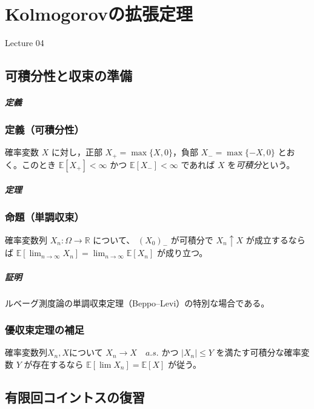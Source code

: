 \documentclass[uplatex,dvipdfmx,11pt,a4paper,openany]{bxjsbook}
\begin{document}
\chapter{Kolmogorovの拡張定理}
Lecture 04

\section{可積分性と収束の準備}
\paragraph{定義}
\subsection{定義（可積分性）}
確率変数 \(X\) に対し，正部 \(X_+=\max\{X,0\}\)，負部 \(X_-=\max\{-X,0\}\) とおく。このとき
                    \(\mathbb{E}[X_+]<\infty\) かつ \(\mathbb{E}[X_-]<\infty\) であれば \(X\) を\emph{可積分}という。


\paragraph{定理}
\subsection{命題（単調収束）}
確率変数列 \(X_n:\Omega\to\mathbb{R}\) 
について、                    \((X_0)_-\) が可積分で \(X_n\uparrow X\) が成立するならば
                    \(\mathbb{E}[\lim_{n\to\infty} X_n]=\lim_{n\to\infty}\mathbb{E}[X_n]\) が成り立つ。

\paragraph{証明}
ルベーグ測度論の単調収束定理（Beppo–Levi）の特別な場合である。



\subsection{優収束定理の補足}
確率変数列\(X_n,X\)について \(X_n\to X\quad a.s.\) かつ \(|X_n|\le Y\) を満たす可積分な確率変数 \(Y\) が存在するなら
                    \(\mathbb{E}[\lim X_n]=\mathbb{E}[X]\) が従う。

\section{有限回コイントスの復習}
\end{document}
